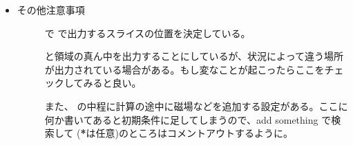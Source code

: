 \documentclass[letterpaper,10pt,dvipdfmx,report]{sphinxmanual}
\begin{document}
\begin{itemize}
\begin{description}
\begin{sphinxVerbatim}[commandchars=\\\{\}]
  
  
\end{sphinxVerbatim}

\end{description}

\item {} \begin{description}
\item[{その他注意事項}] \leavevmode
{} で  で出力するスライスの位置を決定している。

\begin{sphinxVerbatim}[commandchars=\\\{\}]
     
     
\end{sphinxVerbatim}

と領域の真ん中を出力することにしているが、状況によって違う場所が出力されている場合がある。もし変なことが起こったらここをチェックしてみると良い。

また、  の中程に計算の途中に磁場などを追加する設定がある。ここに何か書いてあると初期条件に足してしまうので、add something で検索して  ({\color{red}\bfseries{}*}は任意)のところはコメントアウトするように。

\end{description}

\end{itemize}
\end{document}
